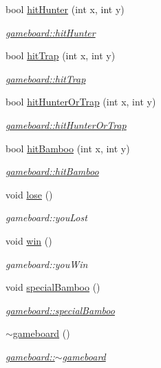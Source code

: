 \begin{DoxyCompactItemize}
bool \hyperlink{classgameboard_aea666716d1f828654b6e8064c5d53505}{hit\+Hunter} (int x, int y)
\begin{DoxyCompactList}\small\item\em \hyperlink{classgameboard_aea666716d1f828654b6e8064c5d53505}{gameboard\+::hit\+Hunter} \end{DoxyCompactList}\item 
bool \hyperlink{classgameboard_a2a5d80b219c6909a3eb499694980f2cb}{hit\+Trap} (int x, int y)
\begin{DoxyCompactList}\small\item\em \hyperlink{classgameboard_a2a5d80b219c6909a3eb499694980f2cb}{gameboard\+::hit\+Trap} \end{DoxyCompactList}\item 
bool \hyperlink{classgameboard_a3a7388778b377859c38e822e375673b6}{hit\+Hunter\+Or\+Trap} (int x, int y)
\begin{DoxyCompactList}\small\item\em \hyperlink{classgameboard_a3a7388778b377859c38e822e375673b6}{gameboard\+::hit\+Hunter\+Or\+Trap} \end{DoxyCompactList}\item 
bool \hyperlink{classgameboard_a5303ffc450756f13318c1e06d826cb66}{hit\+Bamboo} (int x, int y)
\begin{DoxyCompactList}\small\item\em \hyperlink{classgameboard_a5303ffc450756f13318c1e06d826cb66}{gameboard\+::hit\+Bamboo} \end{DoxyCompactList}\item 
void \hyperlink{classgameboard_a4f01e4149726411f1b82c80daa31555d}{lose} ()
\begin{DoxyCompactList}\small\item\em gameboard\+::you\+Lost \end{DoxyCompactList}\item 
void \hyperlink{classgameboard_ae05d74607df7d62400e975687d8a592b}{win} ()
\begin{DoxyCompactList}\small\item\em gameboard\+::you\+Win \end{DoxyCompactList}\item 
void \hyperlink{classgameboard_ab38ac9e4cc233f446fd7ab9d75817557}{special\+Bamboo} ()
\begin{DoxyCompactList}\small\item\em \hyperlink{classgameboard_ab38ac9e4cc233f446fd7ab9d75817557}{gameboard\+::special\+Bamboo} \end{DoxyCompactList}\item 
\hyperlink{classgameboard_ac10e30eecd45bb004a592f97bd0e398f}{$\sim$gameboard} ()
\begin{DoxyCompactList}\small\item\em \hyperlink{classgameboard_ac10e30eecd45bb004a592f97bd0e398f}{gameboard\+::$\sim$gameboard} \end{DoxyCompactList}\end{DoxyCompactItemize}


